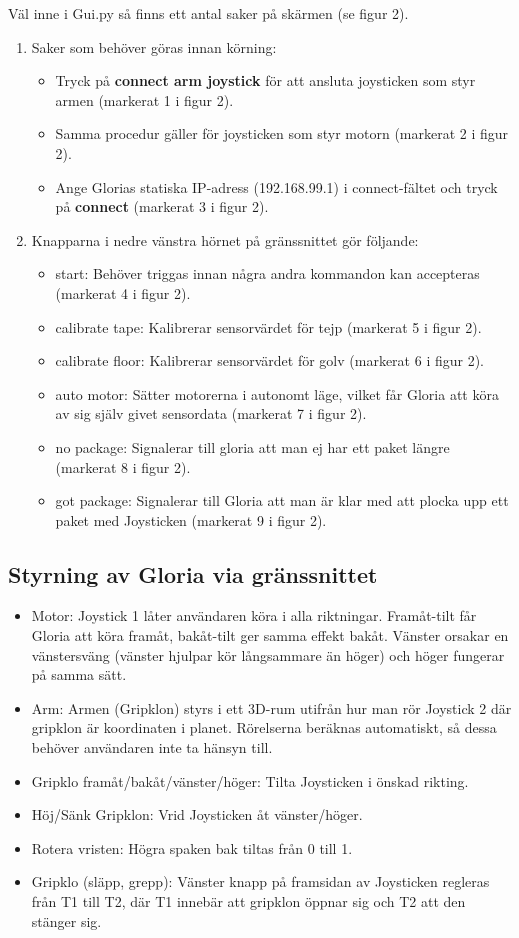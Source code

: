 Väl inne i Gui.py så finns ett antal saker på skärmen (se figur 2).
\begin{enumerate}
	\item Saker som behöver göras innan körning:
	\begin{itemize}
		\item Tryck på \textbf{connect arm joystick} för att ansluta joysticken som styr armen (markerat 1 i figur 2).
		\item Samma procedur gäller för joysticken som styr motorn (markerat 2 i figur 2).
		\item Ange Glorias statiska IP-adress (192.168.99.1) i connect-fältet och tryck på \textbf{connect} (markerat 3 i figur 2).
	\end{itemize}
	\item Knapparna i nedre vänstra hörnet på gränssnittet gör följande:
	\begin{itemize}
		\item start: Behöver triggas innan några andra kommandon kan accepteras (markerat 4 i figur 2).
		\item calibrate tape: Kalibrerar sensorvärdet för tejp (markerat 5 i figur 2).
		\item calibrate floor: Kalibrerar sensorvärdet för golv (markerat 6 i figur 2).
		\item auto motor: Sätter motorerna i autonomt läge, vilket får Gloria att köra av sig själv givet sensordata (markerat 7 i figur 2).
		\item no package: Signalerar till gloria att man ej har ett paket längre (markerat 8 i figur 2).
		\item got package: Signalerar till Gloria att man är klar med att plocka upp ett paket med Joysticken (markerat 9 i figur 2).
	\end{itemize}
\end{enumerate}
\subsection{Styrning av Gloria via gränssnittet}
	\begin{itemize}	
		\item Motor: Joystick 1 låter användaren köra i alla riktningar. Framåt-tilt får Gloria att köra framåt, bakåt-tilt ger samma effekt bakåt. Vänster orsakar en vänstersväng (vänster hjulpar kör långsammare än höger) och höger fungerar på samma sätt.
		\item Arm: Armen (Gripklon) styrs i ett 3D-rum utifrån hur man rör Joystick 2 där gripklon är koordinaten i planet. Rörelserna beräknas automatiskt, så dessa behöver användaren inte ta hänsyn till. 
		\item Gripklo framåt/bakåt/vänster/höger: Tilta Joysticken i önskad rikting.
		\item Höj/Sänk Gripklon: Vrid Joysticken åt vänster/höger.
		\item Rotera vristen: Högra spaken bak tiltas från 0 till 1.
		\item Gripklo (släpp, grepp): Vänster knapp på framsidan av Joysticken regleras från T1 till T2, där T1 innebär att gripklon öppnar sig och T2 att den stänger sig.
	\end{itemize}
